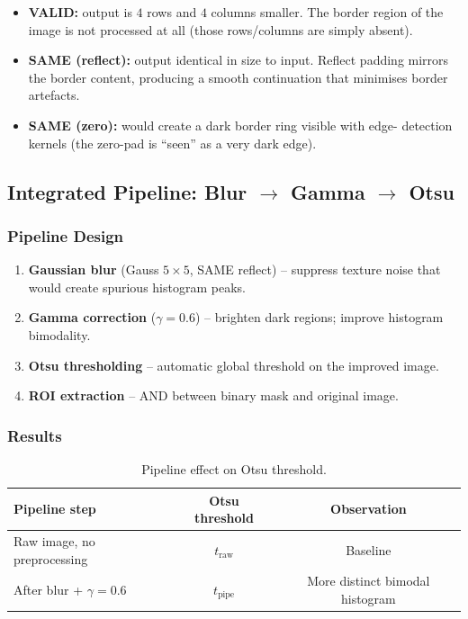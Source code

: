 \documentclass[12pt,a4paper]{article}
\begin{document}
\begin{itemize}[leftmargin=*]
  \item \textbf{VALID:} output is $4$ rows and $4$ columns smaller. The border region
        of the image is not processed at all (those rows/columns are simply absent).
  \item \textbf{SAME (reflect):} output identical in size to input. Reflect
        padding mirrors the border content, producing a smooth continuation that
        minimises border artefacts.
  \item \textbf{SAME (zero):} would create a dark border ring visible with edge-
        detection kernels (the zero-pad is ``seen'' as a very dark edge).
\end{itemize}

\subsection{Integrated Pipeline: Blur $\to$ Gamma $\to$ Otsu}

\subsubsection*{Pipeline Design}

\begin{enumerate}
  \item \textbf{Gaussian blur} (Gauss $5\times5$, SAME reflect) -- suppress texture
        noise that would create spurious histogram peaks.
  \item \textbf{Gamma correction} ($\gamma = 0.6$) -- brighten dark regions;
        improve histogram bimodality.
  \item \textbf{Otsu thresholding} -- automatic global threshold on the improved
        image.
  \item \textbf{ROI extraction} -- AND between binary mask and original image.
\end{enumerate}

\subsubsection*{Results}

\begin{table}[H]
  \centering
  \begin{tabular}{@{}lcc@{}}
    \toprule
    Pipeline step & Otsu threshold & Observation \\
    \midrule
    Raw image, no preprocessing & $t_{\text{raw}}$ & Baseline \\
    After blur + $\gamma = 0.6$ & $t_{\text{pipe}}$ & More distinct bimodal histogram \\
    \bottomrule
  \end{tabular}
  \caption{Pipeline effect on Otsu threshold.}
\end{table}
\end{document}
